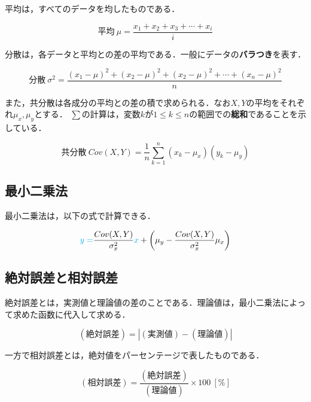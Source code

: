 \documentclass[a4paper,11pt]{ltjsarticle}
\begin{document}
平均は，すべてのデータを均したものである．

\begin{equation}
    平均\ \mu = \dfrac{x_1 + x_2 + x_3 + \cdots + x_i}{i}
\end{equation}

\clearpage

分散は，各データと平均との差の平均である．一般にデータの\textbf{バラつき}を表す．

\begin{equation}
    分散\ \sigma^2 = \dfrac{(x_1 - \mu)^2 + (x_2 - \mu)^2 + (x_2 - \mu)^2 + \cdots + (x_n - \mu)^2}{n}
\end{equation}

また，共分散は各成分の平均との差の積で求められる．なお$X, Y$の平均をそれぞれ$\mu_x, \mu_y$とする．
$\sum$の計算は，変数$k$が$1 \le k \le n$の範囲での\textbf{総和}であることを示している．

\begin{equation}
    共分散\ Cov(X, Y) = \dfrac{1}{n}\sum_{k=1}^{n}(x_k - \mu_x)(y_k - \mu_y)
\end{equation}

\subsection{最小二乗法}

最小二乗法は，以下の式で計算できる．

\begin{equation}
    {\color{cyan}y =} \dfrac{Cov(X, Y)}{\sigma^2_x}{\color{cyan}x} + \left(\mu_y - \dfrac{Cov(X, Y)}{\sigma^2_x}\mu_x\right)
\end{equation}

\subsection{絶対誤差と相対誤差}

絶対誤差とは，実測値と理論値の差のことである．理論値は，最小二乗法によって求めた函数に代入して求める．

\begin{equation}
    (絶対誤差) = \left|(実測値)- (理論値)\right|
\end{equation}

一方で相対誤差とは，絶対値をパーセンテージで表したものである．

\begin{equation}
    (相対誤差) = \dfrac{(絶対誤差)}{(理論値)} \times 100\ [\%]
\end{equation}
\end{document}
